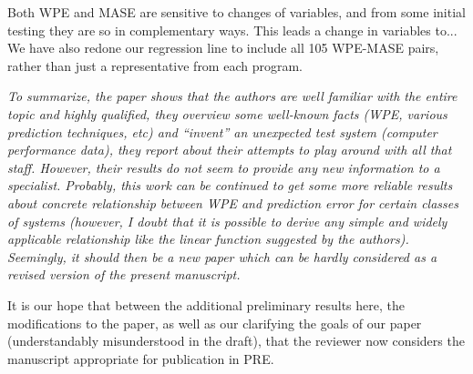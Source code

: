 \documentclass[12pt]{article}
\begin{document}
Both WPE and MASE are sensitive to changes of variables, and from some initial
testing they are so in complementary ways. This leads a change in variables
to...  We have also redone our regression line to include all 105 WPE-MASE
pairs, rather than just a representative from each program.

\emph{To summarize, the paper shows that the authors are well familiar with the
entire topic and highly qualified, they overview some well-known facts (WPE,
various prediction techniques, etc) and ``invent'' an unexpected test system
(computer performance data), they report about their attempts to play around
with all that staff. However, their results do not seem to provide any new
information to a specialist. Probably, this work can be continued to get some
more reliable results about concrete relationship between WPE and prediction
error for certain classes of systems (however, I doubt that it is possible to
derive any simple and widely applicable relationship like the linear function
suggested by the authors). Seemingly, it should then be a new paper which can be
hardly considered as a revised version of the present manuscript.}

It is our hope that between the additional preliminary results here, the
modifications to the paper, as well as our clarifying the goals of our paper
(understandably misunderstood in the draft), that the reviewer now considers the
manuscript appropriate for publication in PRE.
\end{document}
